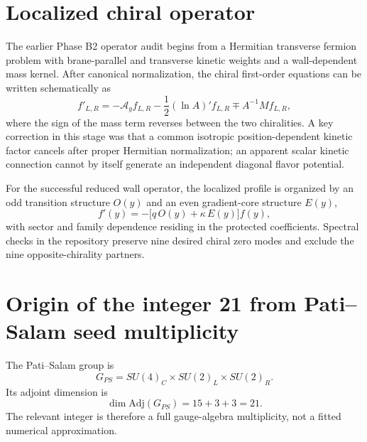\documentclass[11pt]{article}
\begin{document}
\section{Localized chiral operator}

The earlier Phase B2 operator audit begins from a Hermitian transverse fermion problem with brane-parallel and transverse kinetic weights and a wall-dependent mass kernel. After canonical normalization, the chiral first-order equations can be written schematically as
\begin{equation}
 f'_{L,R}
 =-\mathcal A_y f_{L,R}
 -\frac{1}{2}(\ln A)'f_{L,R}
 \mp A^{-1}M f_{L,R},
\end{equation}
where the sign of the mass term reverses between the two chiralities. A key correction in this stage was that a common isotropic position-dependent kinetic factor cancels after proper Hermitian normalization; an apparent scalar kinetic connection cannot by itself generate an independent diagonal flavor potential.

For the successful reduced wall operator, the localized profile is organized by an odd transition structure $O(y)$ and an even gradient-core structure $E(y)$,
\begin{equation}
 f'(y)=-\bigl[q\,O(y)+\kappa\,E(y)\bigr]f(y),
\end{equation}
with sector and family dependence residing in the protected coefficients. Spectral checks in the repository preserve nine desired chiral zero modes and exclude the nine opposite-chirality partners.

\section{Origin of the integer 21 from Pati--Salam seed multiplicity}

The Pati--Salam group is
\begin{equation}
G_{PS}=SU(4)_C\times SU(2)_L\times SU(2)_R.
\end{equation}
Its adjoint dimension is
\begin{equation}
\dim\mathrm{Adj}(G_{PS})=15+3+3=21.
\end{equation}
The relevant integer is therefore a full gauge-algebra multiplicity, not a fitted numerical approximation.
\end{document}
